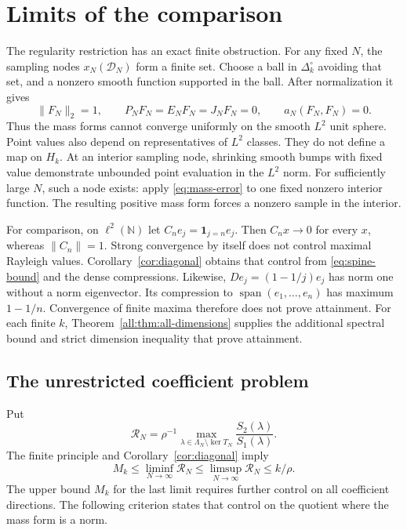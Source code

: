 \documentclass[11pt]{article}
\begin{document}
\section{Limits of the comparison}

The regularity restriction has an exact finite obstruction.
For any fixed $N$, the sampling nodes $x_N(\mathcal D_N)$ form a finite
set.  Choose a ball in $\Delta_k^\circ$ avoiding that set, and a nonzero
smooth function supported in the ball.  After normalization it gives
\begin{equation}\label{eq:sampling-obstruction}
 \|F_N\|_2=1,\qquad P_NF_N=E_NF_N=J_NF_N=0,
 \qquad a_N(F_N,F_N)=0.
\end{equation}
Thus the mass forms cannot converge uniformly on the smooth $L^2$ unit
sphere.  Point values also depend on representatives of $L^2$ classes.
They do not define a map on $H_k$.  At an interior sampling node,
shrinking smooth bumps with fixed value demonstrate unbounded point
evaluation in the $L^2$ norm.  For sufficiently large $N$, such a node
exists: apply \eqref{eq:mass-error} to one fixed nonzero interior function.
The resulting positive mass form forces a nonzero sample in the interior.

For comparison, on $\ell^2(\mathbb N)$ let
$C_ne_j=\mathbf1_{j=n}e_j$.  Then $C_nx\to0$ for every $x$, whereas
$\|C_n\|=1$.  Strong convergence by itself does not control maximal
Rayleigh values.  Corollary~\ref{cor:diagonal} obtains that control from
\eqref{eq:spine-bound} and the dense compressions.
Likewise, $De_j=(1-1/j)e_j$ has norm one without a norm eigenvector.
Its compression to $\operatorname{span}(e_1,\ldots,e_n)$ has maximum
$1-1/n$.  Convergence of finite maxima therefore does not prove attainment.
For each finite $k$, Theorem~\ref{all:thm:all-dimensions} supplies
the additional spectral bound and strict dimension inequality that prove attainment.

\subsection{The unrestricted coefficient problem}

Put
\[
 \mathcal R_N=\rho^{-1}
       \max_{\lambda\in\Lambda_N\setminus\ker T_N}
                           \frac{S_2(\lambda)}{S_1(\lambda)}.
\]
The finite principle and Corollary~\ref{cor:diagonal} imply
\[
              M_k\leq\liminf_{N\to\infty}\mathcal R_N
                    \leq\limsup_{N\to\infty}\mathcal R_N\leq k/\rho.
\]
The upper bound $M_k$ for the last limit requires further control on
all coefficient directions.  The following criterion states that control
on the quotient where the mass form is a norm.
\end{document}
